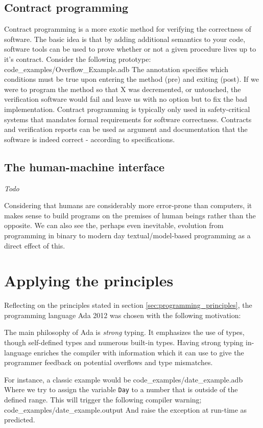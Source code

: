 \documentclass[10pt,a4paper]{article}
\def\Code#1{\texttt{#1}}
\begin{document}
\subsection{Contract programming}
Contract programming is a more exotic method for verifying the correctness of software.
The basic idea is that by adding additional semantics to your code, software tools can be used to prove whether or not a given procedure lives up to it's contract.
Consider the following prototype:
 {code_examples/Overflow_Example.adb}
The annotation specifies which conditions must be true upon entering the method (pre) and exiting (post). If we were to program the method so that X was decremented, or untouched, the verification software would fail and leave us with no option but to fix the bad implementation.
Contract programming is typically only used in safety-critical systems that mandates formal requirements for software correctness. Contracts and verification reports can be used as argument and documentation that the software is indeed correct - according to specifications.

\subsection{The human-machine interface}

\emph{Todo}

Considering that humans are considerably more error-prone than computers, it makes sense to build programs on the premises of human beings rather than the opposite. We can also see the, perhaps even inevitable, evolution from programming in binary to modern day textual/model-based programming as a direct effect of this.


\section{Applying the principles}
Reflecting on the principles stated in section \ref{sec:programming_principles}, the programming language Ada 2012 was chosen with the following motivation:

The main philosophy of Ada is \emph{strong} typing. It emphasizes the use of types, though self-defined types and numerous built-in types. Having strong typing in-language enriches the compiler with information which it can use to give the programmer feedback on potential overflows and type mismatches.

For instance, a classic example would be
 {code_examples/date_example.adb}
Where we try to assign the variable \Code{Day} to a number that is outside of the defined range. This will trigger the following compiler warning;
 {code_examples/date_example.output}
And raise the exception at run-time as predicted.
\end{document}
